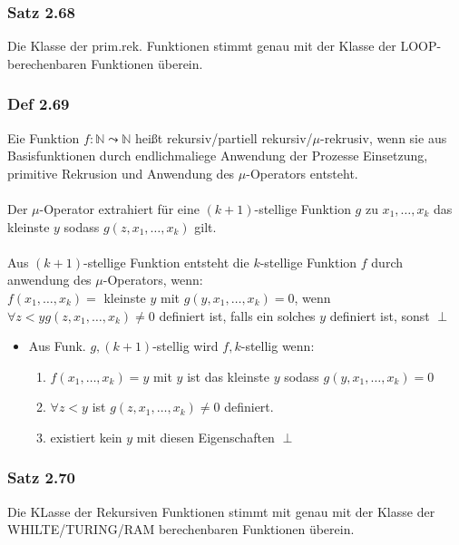 \documentclass[a4paper, 10pt]{article}
\theoremstyle{definition}
\begin{document}
\subsubsection{Satz 2.68} Die Klasse der prim.rek. Funktionen stimmt genau mit der Klasse der LOOP-berechenbaren Funktionen überein.
\subsubsection{Def 2.69} Eie Funktion $f:\mathbb{N}\leadsto\mathbb{N}$ heißt rekursiv/partiell rekursiv/$\mu$-rekrusiv, wenn sie aus Basisfunktionen durch endlichmaliege Anwendung der Prozesse Einsetzung, primitive Rekrusion und Anwendung des $\mu$-Operators entsteht.
\\ \\
Der $\mu$-Operator extrahiert für eine  $(k+1)$-stellige Funktion $g$ zu $x_1,\dots,x_k$ das kleinste $y$ sodass $g(z,x_1,\dots,x_k)$ gilt.
\\ \\
Aus $(k+1)$-stellige Funktion entsteht die $k$-stellige Funktion $f$ durch anwendung des $\mu$-Operators, wenn:\\
$f(x_1,\dots,x_k)=$ kleinste $y$ mit $g(y,x_1,\dots,x_k)=0$, wenn $\forall z<y g(z,x_1,\dots,x_k)\neq 0$ definiert ist, falls ein solches $y$ definiert ist, sonst $\perp$ 
\begin{itemize}
    \item Aus Funk. $g,(k+1)$-stellig wird $f,k$-stellig wenn:\begin{enumerate}
        \item $f(x_1,\dots,x_k)=y$ mit $y$ ist das kleinste $y$ sodass $g(y,x_1,\dots,x_k)=0$
        \item $\forall z<y$ ist $g(z,x_1,\dots,x_k)\neq 0$ definiert.
        \item existiert kein $y$ mit diesen Eigenschaften $\perp$
    \end{enumerate}
    
\end{itemize}
\subsubsection{Satz 2.70} Die KLasse der Rekursiven Funktionen stimmt mit genau mit der Klasse der WHILTE/TURING/RAM berechenbaren Funktionen überein.
\end{document}
